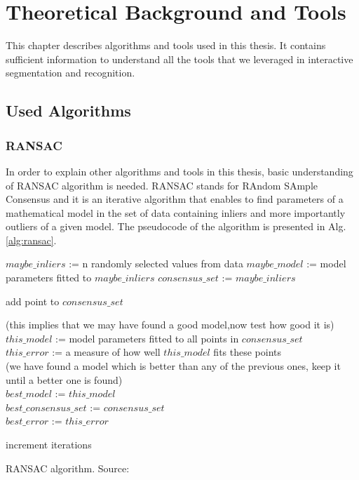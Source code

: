 \chapter{Theoretical Background and Tools}
\label{chapter:Background}
This chapter describes algorithms and tools used in this thesis. It contains sufficient information to understand all the tools that we leveraged in interactive segmentation and recognition.
\section{Used Algorithms}
\subsection{RANSAC}
In order to explain other algorithms and tools in this thesis, basic understanding of RANSAC algorithm is needed. RANSAC stands for RAndom SAmple Consensus and it is an iterative algorithm that enables to find parameters of a mathematical model in the set of data containing inliers and more importantly outliers of a given model. The pseudocode of the algorithm is presented in Alg. \ref{alg:ransac}. 

\begin{algorithm}[htb!]
{
$maybe\_inliers$ := n randomly selected values from data
$maybe\_model$ := model parameters fitted to $maybe\_inliers$
$consensus\_set$ := $maybe\_inliers$

{

{
add point to $consensus\_set$
}

}

{
(this implies that we may have found a good model,now test how good it is)\\
$this\_model$ := model parameters fitted to all points in $consensus\_set$\\
$this\_error$ := a measure of how well $this\_model$ fits these points\\



{            (we have found a model which is better than any of the previous ones,
            keep it until a better one is found)\\
            $best\_model$ := $this\_model$\\
            $best\_consensus\_set$ := $consensus\_set$\\
            $best\_error$ := $this\_error$\\
}


}
    increment iterations

}


\caption{RANSAC algorithm. Source:~\cite{ransac}}
  \label{alg:ransac}
\end{algorithm}

